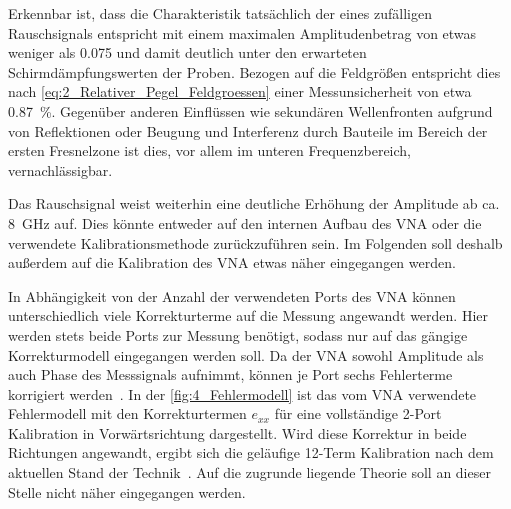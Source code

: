 Erkennbar ist, dass die Charakteristik tatsächlich der eines zufälligen Rauschsignals entspricht mit einem maximalen Amplitudenbetrag von etwas weniger als \SI{0.075}{\Dezibel} und damit deutlich unter den erwarteten Schirmdämpfungswerten der Proben. Bezogen auf die Feldgrößen entspricht dies nach \Gleichung\eqref{eq:2_Relativer_Pegel_Feldgroessen} einer Messunsicherheit von etwa \SI{0.87}{\percent}. Gegenüber anderen Einflüssen wie sekundären Wellenfronten aufgrund von Reflektionen oder Beugung und Interferenz durch Bauteile im Bereich der ersten Fresnelzone ist dies, vor allem im unteren Frequenzbereich, vernachlässigbar. 
\par
\vspace{\linespace}
Das Rauschsignal weist weiterhin eine deutliche Erhöhung der Amplitude ab ca. \SI{8}{\giga\hertz} auf. Dies könnte entweder auf den internen Aufbau des VNA oder die verwendete Kalibrationsmethode zurückzuführen sein. Im Folgenden soll deshalb außerdem auf die Kalibration des VNA etwas näher eingegangen werden.
\par
\vspace{\linespace}
In Abhängigkeit von der Anzahl der verwendeten Ports des VNA können unterschiedlich viele Korrekturterme auf die Messung angewandt werden. Hier werden stets beide Ports zur Messung benötigt, sodass nur auf das gängige Korrekturmodell eingegangen werden soll. Da der VNA sowohl Amplitude als auch Phase des Messsignals aufnimmt, können je Port sechs Fehlerterme korrigiert werden~\cite{VNA-Handbuch}. In der \Abb\ref{fig:4_Fehlermodell} ist das vom VNA verwendete Fehlermodell mit den Korrekturtermen $e_{xx}$ für eine vollständige 2-Port Kalibration in Vorwärtsrichtung dargestellt. Wird diese Korrektur in beide Richtungen angewandt, ergibt sich die geläufige 12-Term Kalibration nach dem aktuellen Stand der Technik~\cite{VNA_Error_Models_and_Calibration_Methods}. Auf die zugrunde liegende Theorie soll an dieser Stelle nicht näher eingegangen werden. 
\par
\vspace{\linespace}



